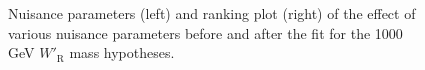 \begin{figure}[H]
  \centering
  \caption{Nuisance parameters (left) and ranking plot (right) of the effect of various nuisance parameters before and after the fit for the 1000 GeV $W'_{\text{R}}$ mass hypotheses.}
  \label{fig:NuisParAndRanking_WpRH1000}
\end{figure}
